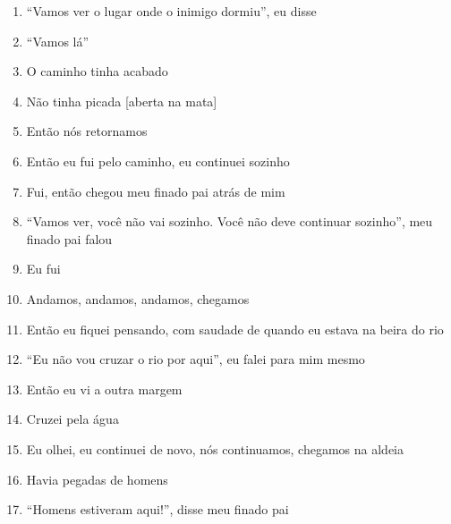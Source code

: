 \begin{enumerate}
 \item ``Vamos ver o lugar onde o inimigo dormiu'', eu disse

 \item ``Vamos lá''

 \begin{center}\end{center}

 \item O caminho tinha acabado

 \item Não tinha picada {[}aberta na mata{]}

 \item Então nós retornamos

 \item Então eu fui pelo caminho, eu continuei sozinho

 \item Fui, então chegou meu finado pai atrás de mim

 \item ``Vamos ver, você não vai sozinho. Você não deve continuar sozinho'',
 meu finado pai falou

 \begin{center}\end{center}

 \item Eu fui

 \item Andamos, andamos, andamos, chegamos

 \item Então eu fiquei pensando, com saudade de quando eu estava na beira do
 rio

 \item ``Eu não vou cruzar o rio por aqui'', eu falei para mim mesmo

 \item Então eu vi a outra margem

 \item Cruzei pela água

 \begin{center}\end{center}

 \item Eu olhei, eu continuei de novo, nós continuamos, chegamos na aldeia

 \item Havia pegadas de homens

 \item ``Homens estiveram aqui!'', disse meu finado pai


\end{enumerate}
